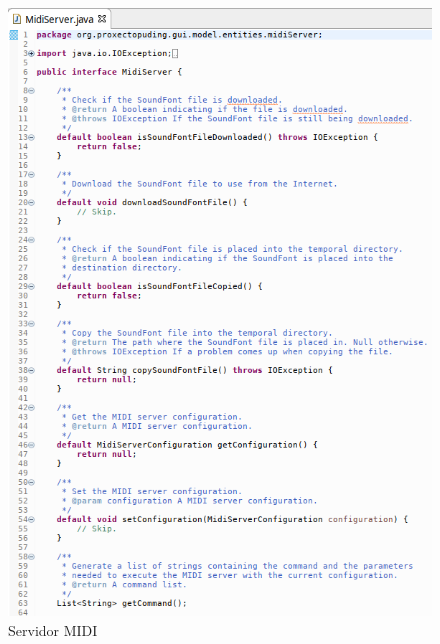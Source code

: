    \begin{figure}[htbp]
    \centering
    \includegraphics[scale=0.6, keepaspectratio=true]{./imagenes/midi-server.png}
    \caption{Servidor MIDI}
    \label{figura:MidiServer}
   \end{figure}
   
